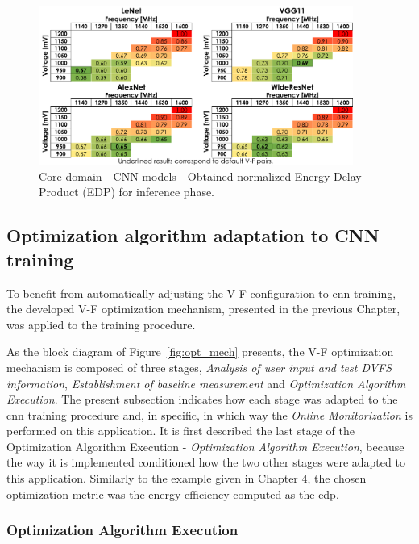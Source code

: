 \begin{figure}[htb]
    \centering
        \includegraphics[width=0.92\textwidth]{Figures/Application To Deep Learning/CNN_EDP_inf.pdf}
        \caption{Core domain - CNN models - Obtained normalized Energy-Delay Product (EDP) for inference phase.}
    \label{fig:CNN_EDP_inf}
\end{figure}

\subsection{Optimization algorithm adaptation to CNN training}

To benefit from automatically adjusting the V-F configuration to \acrshort{cnn} training, the developed V-F optimization mechanism, presented in the previous Chapter, was applied to the training procedure.

As the block diagram of Figure~\ref{fig:opt_mech} presents, the V-F optimization mechanism is composed of three stages, \textit{Analysis of user input and test DVFS information}, \textit{Establishment of baseline measurement} and \textit{Optimization Algorithm Execution}. The present subsection indicates how each stage was adapted to the \acrshort{cnn} training procedure and, in specific, in which way the \textit{Online Monitorization} is performed on this application. It is first described the last stage of the Optimization Algorithm Execution - \textit{Optimization Algorithm Execution}, because the way it is implemented conditioned how the two other stages were adapted to this application. Similarly to the example given in Chapter 4, the chosen optimization metric was the energy-efficiency computed as the \acrshort{edp}. 


\subsubsection{Optimization Algorithm Execution}

